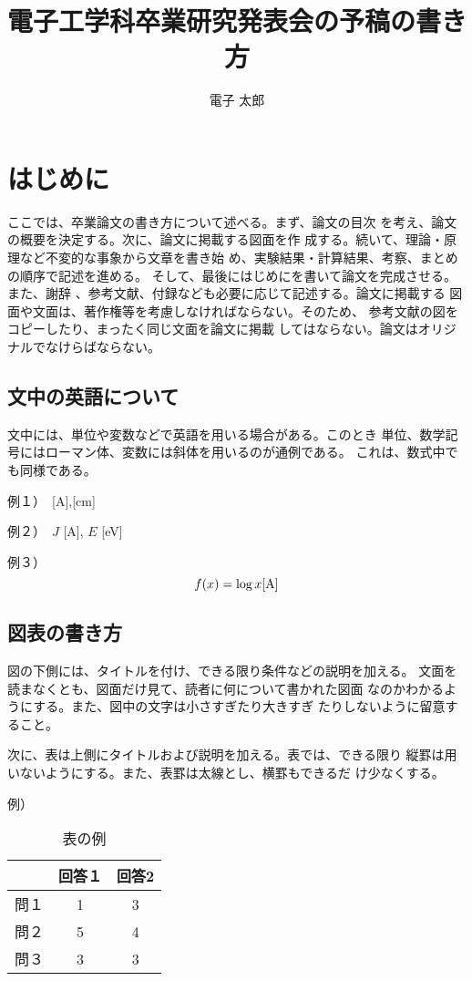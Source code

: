 \documentclass{jarticle}
\title{電子工学科卒業研究発表会の予稿の書き方} %
\author{電子 太郎}%
\begin{document}
%
\maketitle %

\section{はじめに}%
ここでは、卒業論文の書き方について述べる。まず、論文の目次
を考え、論文の概要を決定する。次に、論文に掲載する図面を作
成する。続いて、理論・原理など不変的な事象から文章を書き始
め、実験結果・計算結果、考察、まとめの順序で記述を進める。
そして、最後にはじめにを書いて論文を完成させる。また、謝辞
、参考文献、付録なども必要に応じて記述する。論文に掲載する
図面や文面は、著作権等を考慮しなければならない。そのため、
参考文献の図をコピーしたり、まったく同じ文面を論文に掲載
してはならない。論文はオリジナルでなけらばならない。
\subsection{文中の英語について}%
文中には、単位や変数などで英語を用いる場合がある。このとき
単位、数学記号にはローマン体、変数には斜体を用いるのが通例である。
これは、数式中でも同様である。\par
例１）　[A],[cm] \par
例２）　$J$ [A], $E$ [eV] \par
例３）
\begin{equation}
f(x) = \log x {\rm [A]}  
\end{equation}

\subsection{図表の書き方}%
図の下側には、タイトルを付け、できる限り条件などの説明を加える。
文面を読まなくとも、図面だけ見て、読者に何について書かれた図面
なのかわかるようにする。また、図中の文字は小さすぎたり大きすぎ
たりしないように留意すること\cite{ref:1}。\par%
次に、表は上側にタイトルおよび説明を加える。表では、できる限り
縦罫は用いないようにする。また、表罫は太線とし、横罫もできるだ
け少なくする。\par%
例）
\begin{table}[h]
  \begin{center}
  \caption{表の例}%
    \begin{tabular}{ccc} \hline
         & 回答１ & 回答2 \\ \hline
    問１ & 1 &  3 \\
    問２ & 5 &  4 \\  
    問３ & 3 &  3 \\ \hline
    \end{tabular}
  \end{center}
\end{table}
\end{document}
